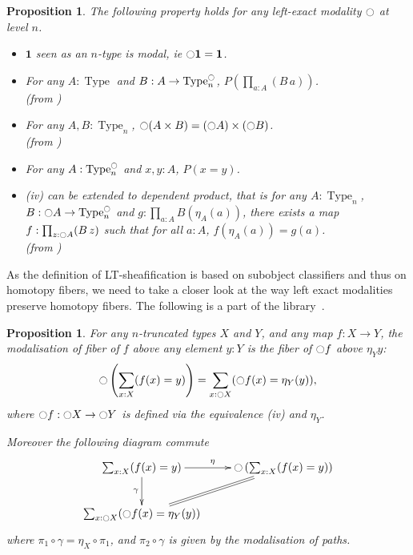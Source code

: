 \documentclass[preprint,9pt,numbers]{sigplanconf}
\newtheorem{prop}[thm]{Proposition}
\newcommand{\mynote}[2]{
    \fbox{\bfseries\sffamily\scriptsize#1}
    {\small$\blacktriangleright$\textsf{\emph{#2}}$\blacktriangleleft$}~}
\newcommand\nt[1]{\mynote{NT}{#1}}
\DeclareMathOperator{\Type}{Type}
\newcommand{\modal}{\ensuremath{\ocircle}}
\newcommand \one {\mathbf{1}}
\newenvironment{mymath}[1][-0em]{%
  \newcommand\mymathaux{\vspace{#1}}%
  \vspace{#1}%
  \begin{equation*}%
  }{ %
    \mymathaux%
  \end{equation*}}
\begin{document}
\begin{prop}

The following property holds for any left-exact modality $\modal$ at
level $n$.
 
\begin{itemize}

\item $\one$ seen as an $n$-type is modal, ie $\modal \one =\one$.
\item 
  For any  $A:\Type$ and $B:A \to \Type_n^\modal$,  $P\left(\prod_{a:A} (B\,
  a)\right)$. \\
(from \cite[Lemma 7.7.2]{hottbook})
\item For any $A,B:\Type_n$,
  $\modal (A\times B) = (\modal A) \times (\modal B)$. \\
(from \cite[Corollary 7.7.2]{hottbook})
\item For any $A:\Type_n^\modal$ and $x,y:A$, $P(x=y)$.
\item 
  {\it (iv)} can be extended to dependent product, that is for any $A:\Type_n$, $B:\modal A \to
  \Type_n^\modal$ and
  $g:\prod_{a:A} B(\eta_A(a))$, there exists a map $f:\prod_{z:\modal
    A} (B\, z)$ such that for all $a:A$, $f(\eta_A(a)) = g(a)$. \\
 (from \cite[Theorem
 7.7.4]{hottbook})
\end{itemize}
\end{prop}

As the definition of LT-sheafification is based on subobject classifiers
and thus on homotopy fibers, we need to take a closer look at the way left
exact modalities preserve homotopy fibers. The following is a part of
the library~\cite{hottlib}.
%
\begin{prop}
\label{sec:defin-basic-prop}
For any $n$-truncated types $X$ and $Y$,
and any map $f:X \to Y$, the modalisation of fiber of $f$ above any element $y:Y$
is the fiber of $\modal f$ above $\eta_Y y$:
\begin{mymath}[-0.3em]\modal \left(\sum_{x:X}  (f(x) = y)\right) = \sum_{x:\modal X}
(\modal f(x) = \eta_Y(y)),\end{mymath}%
where $\modal f:\modal X \to \modal Y$ is defined via the equivalence {\it (iv)} and $\eta_Y$.

Moreover the following diagram commute
\begin{mymath}[-0.3em]\xymatrix{
  \sum_{x:X} (f(x) = y) \ar[r]^\eta \ar[d]_\gamma & \modal \left(\sum_{x:X}  (f(x) = y)\right) \ar@{=}[dl]\\
  \sum_{x:\modal X} (\modal f(x) = \eta_Y(y)) & }\end{mymath}%
where $\pi_1 \circ \gamma = \eta_X \circ \pi_1$, and
$\pi_2 \circ \gamma$ is given by the modalisation of
paths.
\end{prop}
\end{document}
